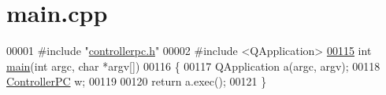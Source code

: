 \hypertarget{main_8cpp_source}{\section{main.\-cpp}
}

\begin{DoxyCode}
00001 \textcolor{preprocessor}{#include "\hyperlink{controllerpc_8h}{controllerpc.h}"}
00002 \textcolor{preprocessor}{#include <QApplication>}
\hypertarget{main_8cpp_source_l00115}{}\hyperlink{main_8cpp_a0ddf1224851353fc92bfbff6f499fa97}{00115} \textcolor{keywordtype}{int} \hyperlink{main_8cpp_a0ddf1224851353fc92bfbff6f499fa97}{main}(\textcolor{keywordtype}{int} argc, \textcolor{keywordtype}{char} *argv[])
00116 \{
00117     QApplication a(argc, argv);
00118     \hyperlink{class_controller_p_c}{ControllerPC} w;
00119 
00120     \textcolor{keywordflow}{return} a.exec();
00121 \}
\end{DoxyCode}
